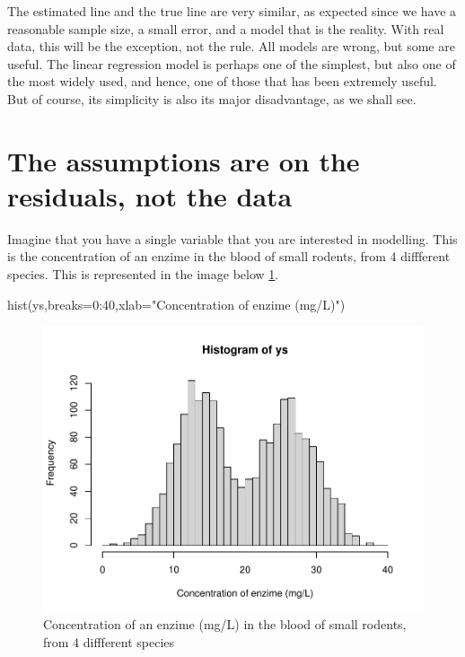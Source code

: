 \documentclass[
]{book}
\newenvironment{Shaded}{\begin{snugshade}}{\end{snugshade}}
\newcommand{\AttributeTok}[1]{\textcolor[rgb]{0.77,0.63,0.00}{#1}}
\newcommand{\DecValTok}[1]{\textcolor[rgb]{0.00,0.00,0.81}{#1}}
\newcommand{\FunctionTok}[1]{\textcolor[rgb]{0.00,0.00,0.00}{#1}}
\newcommand{\NormalTok}[1]{#1}
\newcommand{\SpecialCharTok}[1]{\textcolor[rgb]{0.00,0.00,0.00}{#1}}
\newcommand{\StringTok}[1]{\textcolor[rgb]{0.31,0.60,0.02}{#1}}
\begin{document}
The estimated line and the true line are very similar, as expected since we have a reasonable sample size, a small error, and a model that is the reality. With real data, this will be the exception, not the rule. All models are wrong, but some are useful. The linear regression model is perhaps one of the simplest, but also one of the most widely used, and hence, one of those that has been extremely useful. But of course, its simplicity is also its major disadvantage, as we shall see.

\hypertarget{the-assumptions-are-on-the-residuals-not-the-data}{%
\section{The assumptions are on the residuals, not the data}\label{the-assumptions-are-on-the-residuals-not-the-data}}

Imagine that you have a single variable that you are interested in modelling. This is the concentration of an enzime in the blood of small rodents, from 4 diffferent species. This is represented in the image below \ref{fig:figrodents}.

\begin{Shaded}
\begin{Highlighting}[]
\FunctionTok{hist}\NormalTok{(ys,}\AttributeTok{breaks=}\DecValTok{0}\SpecialCharTok{:}\DecValTok{40}\NormalTok{,}\AttributeTok{xlab=}\StringTok{"Concentration of enzime (mg/L)"}\NormalTok{)}
\end{Highlighting}
\end{Shaded}

\begin{figure}

{\centering \includegraphics[width=0.8\linewidth]{ECOMODbook_files/figure-latex/figrodents-1} 

}

\caption{Concentration of an enzime (mg/L) in the blood of small rodents, from 4 diffferent species}\label{fig:figrodents}
\end{figure}
\end{document}
